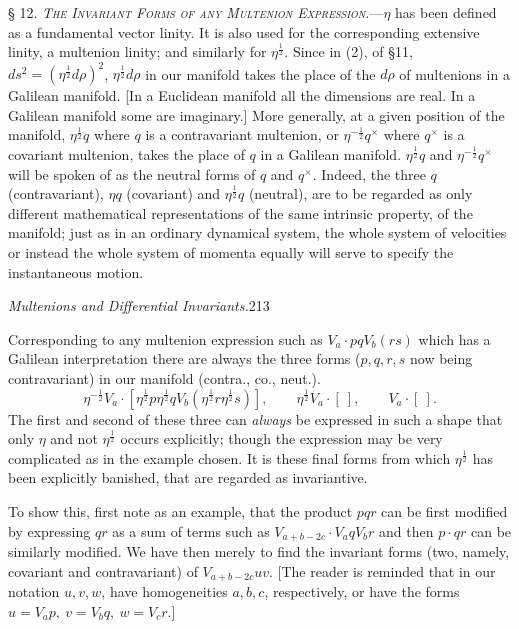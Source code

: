 \documentclass[11pt]{article}
\begin{document}
\noindent\textsc{§ 12. \emph{The Invariant Forms of any Multenion Expression.}}---$\eta$ has been defined as a fundamental vector linity. It is also used for the corresponding extensive linity, a multenion linity; and similarly for $\eta^{\frac12}$. Since in (2), of §11, $ds^2=(\eta^{\frac12}d\rho)^2$, $\eta^{\frac12}d\rho$ in our manifold takes the place of the $d\rho$ of multenions in a Galilean manifold. [In a Euclidean manifold all the dimensions are real. In a Galilean manifold some are imaginary.] More generally, at a given position of the manifold, $\eta^{\frac12}q$ where $q$ is a contravariant multenion, or $\eta^{-\frac12}q^\times$ where $q^\times$ is a covariant multenion, takes the place of $q$ in a Galilean manifold. $\eta^{\frac12}q$ and $\eta^{-\frac12}q^\times$ will be spoken of as the neutral forms of $q$ and $q^\times$. Indeed, the three $q$ (contravariant), $\eta q$ (covariant) and $\eta^{\frac12}q$ (neutral), are to be regarded as only different mathematical representations of the same intrinsic property, of the manifold; just as in an ordinary dynamical system, the whole system of velocities or instead the whole system of momenta equally will serve to specify the instantaneous motion.

\newpage\thispagestyle{empty}\begin{center}\textit{Multenions and Differential Invariants.}\hfill 213\end{center}
Corresponding to any multenion expression such as $V_a\cdot pqV_b(rs)$ which has a Galilean interpretation there are always the three forms ($p,q,r,s$ now being contravariant) in our manifold (contra., co., neut.).
\[
\eta^{-\frac12}V_a\cdot[\eta^{\frac12}p\eta^{\frac12}qV_b(\eta^{\frac12}r\eta^{\frac12}s)],\qquad \eta^{\frac12}V_a\cdot[\ ],\qquad V_a\cdot[\ ].
\]
The first and second of these three can \emph{always} be expressed in such a shape that only $\eta$ and not $\eta^{\frac12}$ occurs explicitly; though the expression may be very complicated as in the example chosen. It is these final forms from which $\eta^{\frac12}$ has been explicitly banished, that are regarded as invariantive.

\indent To show this, first note as an example, that the product $pqr$ can be first modified by expressing $qr$ as a sum of terms such as $V_{a+b-2c}\cdot V_aqV_br$ and then $p\cdot qr$ can be similarly modified. We have then merely to find the invariant forms (two, namely, covariant and contravariant) of $V_{a+b-2c}uv$. [The reader is reminded that in our notation $u,v,w$, have homogeneities $a,b,c$, respectively, or have the forms $u=V_ap,\ v=V_bq,\ w=V_cr$.]
\end{document}
